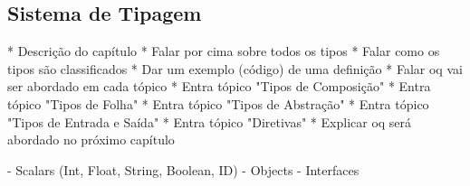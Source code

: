 \subsection[Sistema de Tipagem]{Sistema de Tipagem}

* Descrição do capítulo
* Falar por cima sobre todos os tipos
* Falar como os tipos são classificados
* Dar um exemplo (código) de uma definição
* Falar oq vai ser abordado em cada tópico
* Entra tópico "Tipos de Composição"
* Entra tópico "Tipos de Folha"
* Entra tópico "Tipos de Abstração"
* Entra tópico "Tipos de Entrada e Saída"
* Entra tópico "Diretivas"
* Explicar oq será abordado no próximo capítulo


- Scalars (Int, Float, String, Boolean, ID)
- Objects
- Interfaces
